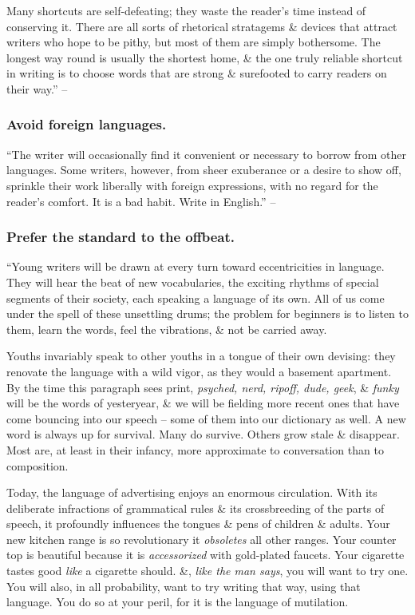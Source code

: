 \documentclass{article}
\begin{document}
Many shortcuts are self-defeating; they waste the reader's time instead of conserving it. There are all sorts of rhetorical stratagems \& devices that attract writers who hope to be pithy, but most of them are simply bothersome. The longest way round is usually the shortest home, \& the one truly reliable shortcut in writing is to choose words that are strong \& surefooted to carry readers on their way.'' -- \cite[p. 98]{Strunk_White_element_style}


\subsubsection{Avoid foreign languages.}
``The writer will occasionally find it convenient or necessary to borrow from other languages. Some writers, however, from sheer exuberance or a desire to show off, sprinkle their work liberally with foreign expressions, with no regard for the reader's comfort. It is a bad habit. Write in English.'' -- \cite[p. 99]{Strunk_White_element_style}


\subsubsection{Prefer the standard to the offbeat.}
``Young writers will be drawn at every turn toward eccentricities in language. They will hear the beat of new vocabularies, the exciting rhythms of special segments of their society, each speaking a language of its own. All of us come under the spell of these unsettling drums; the problem for beginners is to listen to them, learn the words, feel the vibrations, \& not be carried away.

Youths invariably speak to other youths in a tongue of their own devising: they renovate the language with a wild vigor, as they would a basement apartment. By the time this paragraph sees print, {\it psyched, nerd, ripoff, dude, geek}, \& {\it funky} will be the words of yesteryear, \& we will be fielding more recent ones that have come bouncing into our speech -- some of them into our dictionary as well. A new word is always up for survival. Many do survive. Others grow stale \& disappear. Most are, at least in their infancy, more approximate to conversation than to composition.

Today, the language of advertising enjoys an enormous circulation. With its deliberate infractions of grammatical rules \& its crossbreeding of the parts of speech, it profoundly influences the tongues \& pens of children \& adults. Your new kitchen range is so revolutionary it {\it obsoletes} all other ranges. Your counter top is beautiful because it is {\it accessorized} with gold-plated faucets. Your cigarette tastes good {\it like} a cigarette should. \&, {\it like the man says}, you will want to try one. You will also, in all probability, want to try writing that way, using that language. You do so at your peril, for it is the language of mutilation.
\end{document}
